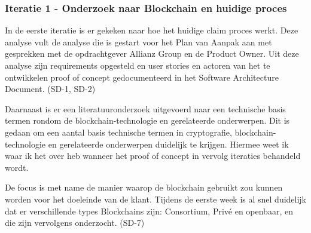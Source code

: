 \subsubsection{Iteratie 1 - Onderzoek naar Blockchain en huidige proces}
In de eerste iteratie is er gekeken naar hoe het huidige claim proces werkt. Deze analyse vult de analyse die is gestart voor het Plan van Aanpak aan met gesprekken met de opdrachtgever Allianz Group en de Product Owner. Uit deze analyse zijn requirements opgesteld en user stories en actoren van het te ontwikkelen proof of concept gedocumenteerd in het Software Architecture Document. (SD-1, SD-2)\par

Daarnaast is er een literatuuronderzoek uitgevoerd naar een technische basis termen rondom de blockchain-technologie en gerelateerde onderwerpen. Dit is gedaan om een aantal basis technische termen in cryptografie, blockchain-technologie en gerelateerde onderwerpen duidelijk te krijgen. Hiermee weet ik waar ik het over heb wanneer het proof of concept in vervolg iteraties behandeld wordt.\par

De focus is met name de manier waarop de blockchain gebruikt zou kunnen worden voor het doeleinde van de klant. Tijdens de eerste week is al snel duidelijk dat er verschillende types Blockchains zijn: Consortium, Privé en openbaar, en die zijn vervolgens onderzocht. (SD-7)